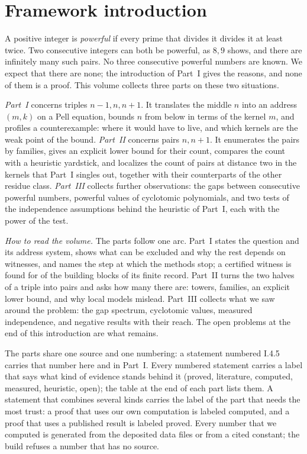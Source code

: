 %
%
\section*{Framework introduction}

A positive integer is \emph{powerful} if every prime that divides it divides it at least twice. Two consecutive integers can both be
powerful, as $8, 9$ shows, and there are infinitely many such pairs. No three consecutive powerful numbers are known. We expect that there
are none; the introduction of Part~I gives the reasons, and none of them is a proof. This volume collects three parts on these two
situations.

\emph{Part~I} concerns triples $n - 1, n, n + 1$. It translates the middle $n$ into an address $(m, k)$ on a Pell equation, bounds $n$ from
below in terms of the kernel $m$, and profiles a counterexample: where it would have to live, and which kernels are the weak point of the
bound. \emph{Part~II} concerns pairs $n, n + 1$. It enumerates the pairs by families, gives an explicit lower bound for their count, compares
the count with a heuristic yardstick, and localizes the count of pairs at distance two in the kernels that Part~I singles out, together
with their counterparts of the other residue class.
\emph{Part~III} collects further observations: the gaps between consecutive powerful numbers, powerful values of cyclotomic polynomials,
and two tests of the independence assumptions behind the heuristic of Part~I, each with the power of the test.

\emph{How to read the volume.} The parts follow one arc. Part~I states the question and its address system, shows what can be excluded
and why the rest depends on witnesses, and names the step at which the methods stop; a certified witness is found for  of the
 building blocks of its finite record. Part~II turns the two halves of a triple into pairs and asks how many there are: towers,
families, an explicit lower bound, and why local models mislead. Part~III collects what we saw around the problem: the gap spectrum,
cyclotomic values, measured independence, and negative results with their reach. The open problems at the end of this introduction are
what remains.

The parts share one source and one numbering: a statement numbered I.4.5 carries that number here and in Part~I. Every numbered
statement carries a label that says what kind of evidence stands behind it (proved, literature, computed, measured, heuristic, open); the
table at the end of each part lists them. A statement that combines several kinds carries the label of the part that needs the most trust: a proof that uses our own computation is labeled computed, and a proof that uses a published result is labeled proved. Every number that we computed is generated from the deposited data files or from a cited
constant; the build refuses a
number that has no source.


